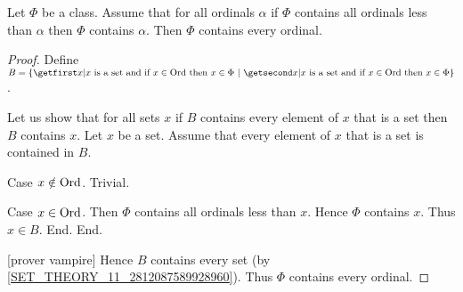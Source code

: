 \documentclass[../set-theory.tex]{subfiles}
\begin{document}
  \begin{forthel}
    \begin{theorem}\label{SET_THEORY_15_8493935460614144}
      Let $\Phi$ be a class.
      Assume that for all ordinals $\alpha$ if $\Phi$ contains all ordinals
      less than $\alpha$ then $\Phi$ contains $\alpha$.
      Then $\Phi$ contains every ordinal.
    \end{theorem}
    \begin{proof}
      Define $B = \class{x | \text{$x$ is a set and if $x \in \Ord$ then
      $x \in \Phi$}}$.

      Let us show that for all sets $x$ if $B$ contains every element of $x$
      that is a set then $B$ contains $x$.
        Let $x$ be a set.
        Assume that every element of $x$ that is a set is contained in $B$.

        Case $x \notin \mathrm{Ord}$. Trivial.

        Case $x \in \mathrm{Ord}$.
          Then $\Phi$ contains all ordinals less than $x$.
          Hence $\Phi$ contains $x$.
          Thus $x \in B$.
        End.
      End.

      [prover vampire] %
      Hence $B$ contains every set (by \ref{SET_THEORY_11_2812087589928960}).
      Thus $\Phi$ contains every ordinal.
    \end{proof}
  \end{forthel}
\end{document}
